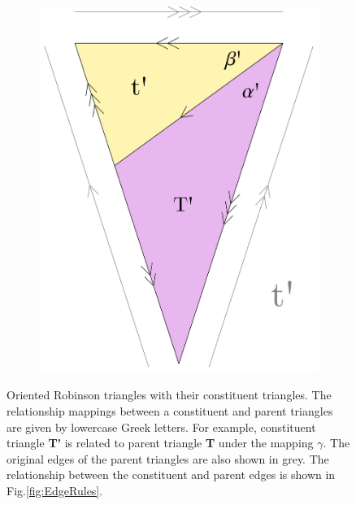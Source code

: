 \documentclass[
  oneside,
  11pt, a4paper,
  footinclude=true,
  headinclude=true,
  cleardoublepage=empty
]{scrbook}
\begin{document}
\begin{figure}[H]
        \begin{subfigure}[t]{0.55\textwidth}
        \end{subfigure}\hfill
        \begin{subfigure}[t]{0.35\textwidth}
                \includegraphics[width=\textwidth]{TS'}
        \end{subfigure}   
        \caption{Oriented Robinson triangles with their constituent triangles. The relationship mappings between a constituent and parent triangles are given by lowercase Greek letters. For example, constituent triangle \textbf{T'} is related to parent triangle \textbf{T} under the mapping $\gamma$. The original edges of the parent triangles are also shown in grey. The relationship between the constituent and parent edges is shown in Fig.\ref{fig:EdgeRules}.}
        \label{fig:OrientedSub}                     
\end{figure}
\end{document}
